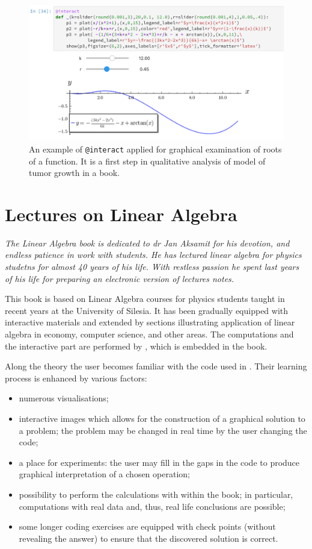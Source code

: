 \documentclass{deliverablereport}
\begin{document}
\begin{figure}
\centerline{\includegraphics[width=.7\textwidth]{interact_npb.png}}
\caption{\label{fig:interact2} An example of \texttt{@interact}
  applied for graphical examination of roots of a function. It is a
  first step in qualitative analysis of model of tumor growth in a
  book.  }
\end{figure}



\section{Lectures on Linear Algebra}



{\it The Linear Algebra book is dedicated to dr Jan Aksamit for his
devotion, and endless patience in work with students. He has lectured
linear algebra for physics studetns for almost 40 years of his
life. With restless passion he spent last years of his life for
preparing an electronic version of lectures notes.}


This book is based on Linear Algebra courses for physics students
taught in recent years at the University of Silesia. It has been
gradually equipped with interactive materials and extended by sections
illustrating application of linear algebra in economy, computer
science, and other areas. The computations and the interactive part are
performed by \Sage, which is embedded in the book.

Along the theory the user becomes familiar with the code used in
\Sage. Their learning process is enhanced by various factors:
\begin{itemize}
\item numerous visualisations;
\item interactive images which allows for the construction of a
  graphical solution to a problem; the problem may be changed in real
  time by the user changing the code;
\item a place for experiments: the user may fill in the gaps in the code
  to produce graphical interpretation of a chosen operation;
\item possibility to perform the calculations with \Sage within the
  book; in particular, computations with real data and, thus, real
  life conclusions are possible;
\item some longer coding exercises are equipped with check points
  (without revealing the answer) to ensure that the discovered
  solution is correct.
\end{itemize}
\end{document}
